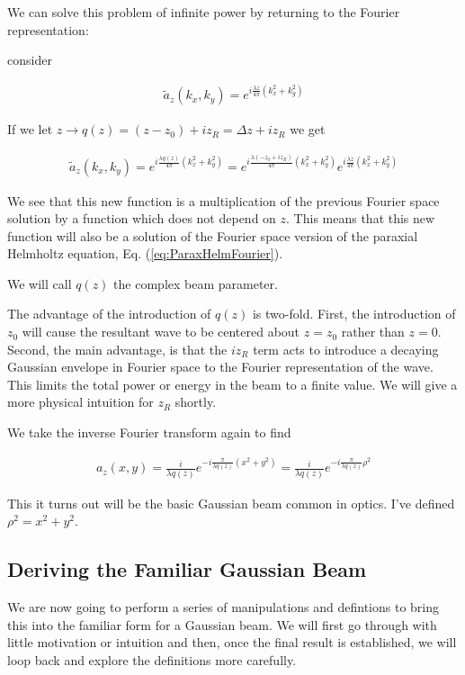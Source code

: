 \documentclass[12pt]{article}
\begin{document}
We can solve this problem of infinite power by returning to the Fourier representation:

consider

\begin{align}
\tilde{a}_z(k_x, k_y) = e^{i \frac{\lambda z}{4\pi}(k_x^2 + k_y^2)}
\end{align}

If we let $z\rightarrow q(z) = (z-z_0) + i z_R = \Delta z + i z_R$ we get

\begin{align}
\tilde{a}_z(k_x, k_y) = e^{i \frac{\lambda q(z)}{4\pi}(k_x^2 + k_y^2)} = e^{i \frac{\lambda (-z_0 + i z_R)}{4\pi}(k_x^2 + k_y^2)} e^{i\frac{\lambda z}{4\pi}(k_x^2 + k_y^2)}
\end{align}

We see that this new function is a multiplication of the previous Fourier space solution by a function which does not depend on $z$.
This means that this new function will also be a solution of the Fourier space version of the paraxial Helmholtz equation, Eq. (\ref{eq:ParaxHelmFourier}).

We will call $q(z)$ the complex beam parameter.

The advantage of the introduction of $q(z)$ is two-fold.
First, the introduction of $z_0$ will cause the resultant wave to be centered about $z=z_0$ rather than $z=0$. 
Second, the main advantage, is that the $iz_R$ term acts to introduce a decaying Gaussian envelope in Fourier space to the Fourier representation of the wave.
This  limits the total power or energy in the beam to a finite value.
We will give a more physical intuition for $z_R$ shortly.

We take the inverse Fourier transform again to find

\begin{align}
a_z(x,y) = \frac{i}{\lambda q(z)} e^{-i\frac{\pi}{\lambda q(z)}(x^2 + y^2)} = \frac{i}{\lambda q(z)} e^{-i\frac{\pi}{\lambda q(z)} \rho^2 }
\end{align}

This it turns out will be the basic Gaussian beam common in optics.
I've defined $\rho^2 = x^2 + y^2$.

\subsection{Deriving the Familiar Gaussian Beam}
We are now going to perform a series of manipulations and defintions to bring this into the familiar form for a Gaussian beam.
We will first go through with little motivation or intuition and then, once the final result is established, we will loop back and explore the definitions more carefully.
\end{document}
